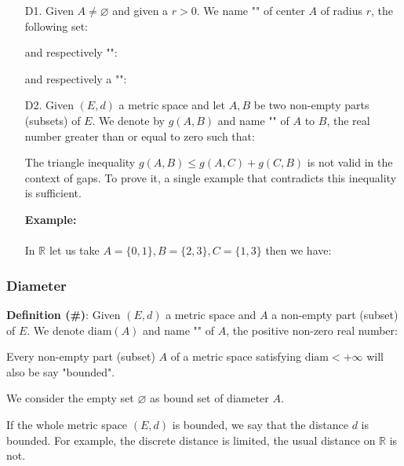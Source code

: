 	\begin{enumerate}
		\item[D1.] Given $A\neq \varnothing$ and given a $r>0$. We name "" of center $A$ of radius $r$, the following set:
		
		and respectively "":
		
		and respectively  a "":
		
		
		\item[D2.] Given $(E, d)$ a metric space and let $A, B$ be two non-empty parts (subsets) of $E$. We denote by $g (A, B)$ and name "" of $A$ to $B$, the real number greater than or equal to zero such that:
		
		\begin{tcolorbox}[title=Remark,colframe=black,arc=10pt]
		The triangle inequality $g(A,B)\leq g(A,C)+g(C,B)$ is not valid in the context of gaps. To prove it, a single example that contradicts this inequality is sufficient.
		\end{tcolorbox}
		\begin{tcolorbox}[colframe=black,colback=white,sharp corners]
		\textbf{{\Large {}}Example:}\\\\
		In $\mathbb{R}$ let us take $A=\{0,1\},B=\{2,3\},C=\{1,3\}$ then we have:
		
		\end{tcolorbox}	
	\end{enumerate}
	
	\subsubsection{Diameter}
	\textbf{Definition (\#\mydef)}: Given $(E, d)$ a metric space and $A$ a non-empty part (subset) of $E$. We denote $\text{diam}(A)$ and name "" of $A$, the positive non-zero real number:
	
	Every non-empty part (subset) $A$ of a metric space satisfying $\text{diam}<+\infty$ will also be say "bounded".
	\begin{tcolorbox}[title=Remark,colframe=black,arc=10pt]
	We consider the empty set $\varnothing$ as bound set of diameter $A$.
	\end{tcolorbox}	
	If the whole metric space $(E,d)$ is bounded, we say that the distance $d$ is bounded. For example, the discrete distance is limited, the usual distance on $\mathbb{R}$ is not.
	
